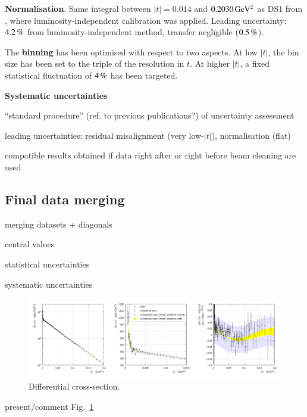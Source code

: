 {\bf Normalisation}. Same integral between $|t| = 0.014$ and $0.2030\,{\rm GeV^2}$ as DS1 from \cite{prl111}, where luminosity-independent calibration was applied. Leading uncertainty: $4.2\,{\rm \%}$ from luminosity-independent method, transfer negligible ($0.5\,{\rm \%}$).



The {\bf binning} has been optimised with respect to two aspects. At low $|t|$, the bin size has been set to the triple of the resolution in $t$. At higher $|t|$, a fixed statistical fluctuation of $4\,{\rm \%}$ has been targeted.

{\bf Systematic uncertainties}

\> ``standard procedure'' (ref. to previous publications?) of uncertainty assessment

\> leading uncertainties: residual misalignment (very low-$|t|$), normalisation (flat)

\> compatible results obtained if data right after or right before beam cleaning are used



\subsection{Final data merging}

\> merging datasets + diagonals

\> central values

\> statistical uncertainties

\> systematic uncertainties





\begin{figure}
\begin{center}
\includegraphics[width=18cm]{fig/t_dist_tabulation.pdf}
\vskip-3mm
\caption{Differential cross-section.  }
\label{fig:dsdt}
\end{center}
\end{figure}

\> present/comment Fig.~\ref{fig:dsdt}


